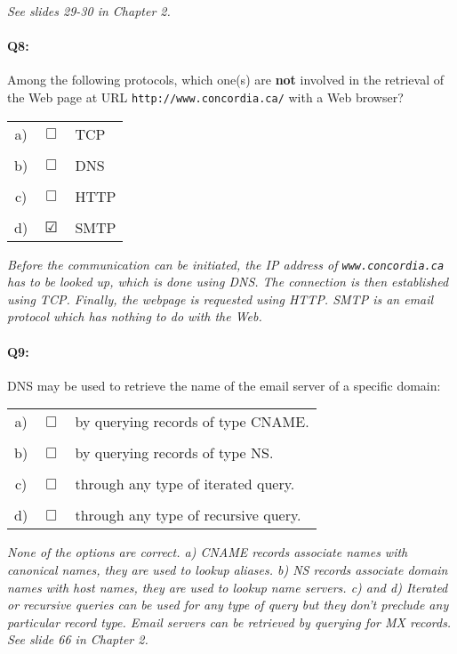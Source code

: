 \documentclass{llncs}
\newcommand{\answer}[1]{{\color{red}\textit{#1}\color{black}}}
\begin{document}
\answer{See slides 29-30 in Chapter 2.}

\paragraph{\textbf{Q8:}} Among the following protocols, which one(s) are \textbf{not} involved in the retrieval of the Web page at URL \texttt{http://www.concordia.ca/} with a Web browser?\\

\begin{tabular}{ccl}
  a) & $\Box$ & TCP\\
  \\
  b) & $\Box$ & DNS\\
  \\
  c) & $\Box$ & HTTP\\
  \\
  d) & $\CheckedBox$ & SMTP\\
\end{tabular}

\answer{Before the communication can be initiated, the IP address of
  \texttt{www.concordia.ca} has to be looked up, which is done using
  DNS. The connection is then established using TCP. Finally, the
  webpage is requested using HTTP. SMTP is an email protocol which has
  nothing to do with the Web.}

\paragraph{\textbf{Q9:}} DNS may be used to retrieve the name of the email server of a specific domain:\\

\begin{tabular}{ccl}
  a) & $\Box$ & by querying records of type CNAME.\\
  \\
  b) & $\Box$ & by querying records of type NS.\\
  \\
  c) & $\Box$ & through any type of iterated query.\\
  \\
  d) & $\Box$ & through any type of recursive query.\\
\end{tabular}

\answer{None of the options are correct. a) CNAME records associate
  names with canonical names, they are used to lookup aliases. b) NS
  records associate domain names with host names, they are used to
  lookup name servers. c) and d) Iterated or recursive queries can be
  used for any type of query but they don't preclude any particular
  record type. Email servers can be retrieved by querying for MX
  records. See slide 66 in Chapter 2.}
\end{document}

